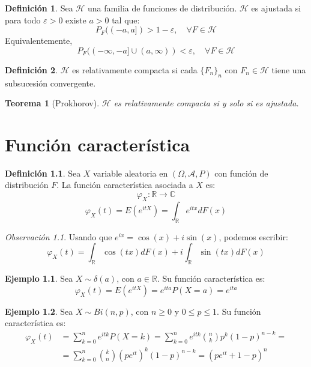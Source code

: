 \documentclass{report}
\newtheorem{theorem}{Teorema}[chapter]
\theoremstyle{remark}
\newtheorem*{remark}{Observación}
\theoremstyle{remark}
\theoremstyle{remark}
\theoremstyle{definition}
\newtheorem{definition}{Definición}[chapter]
\theoremstyle{definition}
\theoremstyle{definition}
\newtheorem*{example}{Ejemplo}
\theoremstyle{definition}
\begin{document}
\begin{definition}
    Sea $\mathcal{H}$ una familia de funciones de distribución.
    $\mathcal{H}$ es ajustada si para todo $\varepsilon>0$ existe $a>0$ tal que:
    $$P_F((-a,a]) > 1-\varepsilon, \quad \forall F \in \mathcal{H}$$
    Equivalentemente,
    $$P_F((-\infty,-a] \cup (a,\infty)) < \varepsilon, \quad \forall F \in \mathcal{H}$$
\end{definition}

\begin{definition}
    $\mathcal{H}$ es relativamente compacta si cada $\{F_n\}_n$ con $F_n \in \mathcal{H}$ tiene una subsucesión convergente.
\end{definition}

\begin{theorem}[Prokhorov]
    $\mathcal{H}$ es relativamente compacta si y solo si es ajustada.
\end{theorem}

\chapter{Función característica}
\begin{definition}
    Sea $X$ variable aleatoria en $(\Omega, \mathcal{A}, P)$ con función de distribución $F$.
    La función característica asociada a $X$ es:
    $$\varphi_X: \mathbb{R} \to \mathbb{C}$$
    $$\varphi_X(t) = E(e^{itX}) = \int_\mathbb{R} e^{itx}dF(x)$$
\end{definition}

\begin{remark}
    Usando que $e^{ix} = \cos(x) + i\sin(x)$, podemos escribir:
    $$\varphi_X(t) = \int_\mathbb{R} \cos(tx)dF(x) + i \int_\mathbb{R} \sin(tx)dF(x)$$
\end{remark}

\begin{example}
    Sea $X \sim \delta(a)$, con $a \in \mathbb{R}$.
    Su función característica es:
    $$\varphi_X(t) = E(e^{itX}) = e^{ita} P(X=a) = e^{ita}$$
\end{example}

\begin{example}
    Sea $X \sim Bi(n, p)$, con $n \geq 0$ y $0 \leq p \leq 1$.
    Su función característica es:
    \begin{align*}
        \varphi_X(t) & = \sum_{k=0}^n e^{itk} P(X=k) = \sum_{k=0}^n e^{itk} \binom{n}{k} p^k(1-p)^{n-k} = \\
                     & = \sum_{k=0}^n \binom{k}{n} (pe^{it})^k(1-p)^{n-k} = (pe^{it} + 1 - p)^n
    \end{align*}
\end{example}
\end{document}
